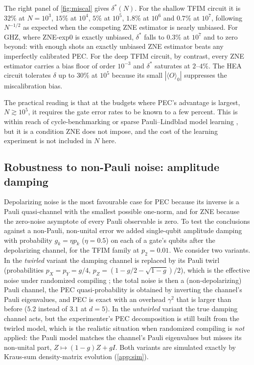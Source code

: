 \documentclass[aps,pra,reprint,amsmath,amssymb,nofootinbib,superscriptaddress]{revtex4-2}
\theoremstyle{remark}
\begin{document}
The right panel of \cref{fig:miscal} gives $\delta^*(N)$. For the shallow TFIM circuit it is $32\%$ at $N=10^3$, $15\%$ at $10^4$, $5\%$ at $10^5$, $1.8\%$ at $10^6$ and $0.7\%$ at $10^7$, following $N^{-1/2}$ as expected when the competing ZNE estimator is nearly unbiased. For GHZ, where ZNE-exp0 is exactly unbiased, $\delta^*$ falls to $0.3\%$ at $10^7$ and to zero beyond: with enough shots an exactly unbiased ZNE estimator beats any imperfectly calibrated PEC. For the deep TFIM circuit, by contrast, every ZNE estimator carries a bias floor of order $10^{-3}$ and $\delta^*$ saturates at $2$--$4\%$. The HEA circuit tolerates $\delta$ up to $30\%$ at $10^5$ because its small $|\langle O\rangle_0|$ suppresses the miscalibration bias.

The practical reading is that at the budgets where PEC's advantage is largest, $N\gtrsim10^5$, it requires the gate error rates to be known to a few percent. This is within reach of cycle-benchmarking or sparse Pauli--Lindblad model learning \cite{vandenberg2023}, but it is a condition ZNE does not impose, and the cost of the learning experiment is not included in $N$ here.


\subsection{Robustness to non-Pauli noise: amplitude damping}
\label{sec:ampdamp}

Depolarizing noise is the most favourable case for PEC because its inverse is a Pauli quasi-channel with the smallest possible one-norm, and for ZNE because the zero-noise asymptote of every Pauli observable is zero. To test the conclusions against a non-Pauli, non-unital error we added single-qubit amplitude damping with probability $g_k=\eta p_k$ ($\eta=0.5$) on each of a gate's qubits after the depolarizing channel, for the TFIM family at $p_2=0.01$. We consider two variants. In the \emph{twirled} variant the damping channel is replaced by its Pauli twirl (probabilities $p_X=p_Y=g/4$, $p_Z=(1-g/2-\sqrt{1-g})/2$), which is the effective noise under randomized compiling \cite{wallman2016}; the total noise is then a (non-depolarizing) Pauli channel, the PEC quasi-probability is obtained by inverting the channel's Pauli eigenvalues, and PEC is exact with an overhead $\gamma^2$ that is larger than before ($5.2$ instead of $3.1$ at $d=5$). In the \emph{untwirled} variant the true damping channel acts, but the experimenter's PEC decomposition is still built from the twirled model, which is the realistic situation when randomized compiling is \emph{not} applied: the Pauli model matches the channel's Pauli eigenvalues but misses its non-unital part, $Z\mapsto(1-g)Z+gI$. Both variants are simulated exactly by Kraus-sum density-matrix evolution (\cref{app:sim}).
\end{document}
